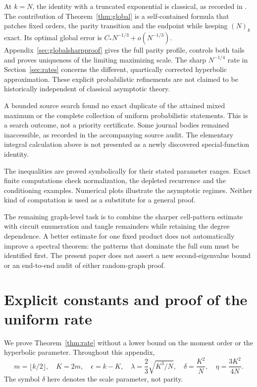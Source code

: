 \documentclass[11pt]{article}
\theoremstyle{definition}
\theoremstyle{remark}
\newcommand{\1}{\mathbf 1}
\begin{document}
At $k=N$, the identity with a truncated exponential is classical, as recorded in \cite[Section 1]{DMO}. The contribution of Theorem~\ref{thm:global} is a self-contained formula that patches fixed orders, the parity transition and the endpoint while keeping $(N)_k$ exact. Its optimal global error is $C_*N^{-1/3}+o(N^{-1/3})$. Appendix~\ref{sec:globalsharpproof} gives the full parity profile, controls both tails and proves uniqueness of the limiting maximizing scale. The sharp $N^{-1/4}$ rate in Section~\ref{sec:rates} concerns the different, quartically corrected hyperbolic approximation. These explicit probabilistic refinements are not claimed to be historically independent of classical asymptotic theory.

A bounded source search found no exact duplicate of the attained mixed maximum or the complete collection of uniform probabilistic statements. This is a search outcome, not a priority certificate. Some journal bodies remained inaccessible, as recorded in the accompanying source audit. The elementary integral calculation above is not presented as a newly discovered special-function identity.

The inequalities are proved symbolically for their stated parameter ranges. Exact finite computations check normalization, the depleted recurrence and the conditioning examples. Numerical plots illustrate the asymptotic regimes. Neither kind of computation is used as a substitute for a general proof.

The remaining graph-level task is to combine the sharper cell-pattern estimate with circuit enumeration and tangle remainders while retaining the degree dependence. A better estimate for one fixed product does not automatically improve a spectral theorem: the patterns that dominate the full sum must be identified first. The present paper does not assert a new second-eigenvalue bound or an end-to-end audit of either random-graph proof.


\appendix
\section{Explicit constants and proof of the uniform rate}\label{sec:rateproof}

We prove Theorem~\ref{thm:rate} without a lower bound on the moment order or the hyperbolic parameter. Throughout this appendix,
\[
m=\lfloor k/2\rfloor,\quad K=2m,\quad\epsilon=k-K,\quad
\lambda=\frac23\sqrt{K^3/N},\quad
\delta=\frac{K^2}{N},\quad\eta=\frac{3K^2}{4N}.
\]
The symbol $\delta$ here denotes the scale parameter, not parity.
\end{document}
